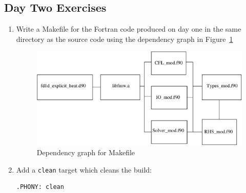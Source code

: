 \documentclass[12pt]{article}
\begin{document}
\subsection*{Day Two Exercises}
\begin{enumerate}
\item Write a Makefile for the Fortran code produced on day one in the same directory as the source
  code using the dependency graph in Figure~\ref{make_depend:eps}

\begin{figure}[H]
\includegraphics[width=\linewidth]{make_depend.eps}
\caption{Dependency graph for Makefile}
\label{make_depend:eps}
\end{figure}
\item Add a \texttt{clean} target which cleans the build:
\begin{verbatim}
.PHONY: clean


\end{verbatim}
\end{enumerate}
\end{document}
